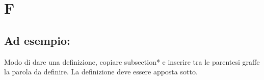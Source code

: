 \section*{F}
\markright{}
\subsection*{Ad esempio:}
Modo di dare una definizione, copiare subsection*{} e inserire tra le parentesi graffe la parola da definire. La definizione deve essere apposta sotto.